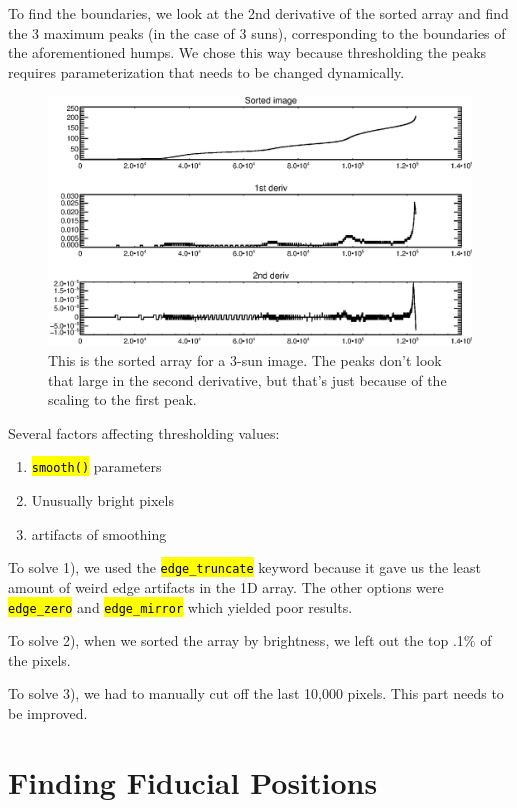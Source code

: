\documentclass[10pt]{scrartcl}
\begin{document}
To find the boundaries, we look at the 2nd derivative of the sorted array and find the 3 maximum peaks (in the case of 3 suns), corresponding to the boundaries of the aforementioned humps. We chose this way because thresholding the peaks requires parameterization that needs to be changed dynamically. 

\begin{figure}[!ht]
   \includegraphics[width=.75\textwidth]{../plots_tables_images/sortedarray.eps}%
   \caption{This is the sorted array for a 3-sun image. The peaks don't look that large in the second derivative, but that's just because of the scaling to the first peak.}\label{peaks}
\end{figure}

Several factors affecting thresholding values:

\begin{enumerate}
    \item \hl{\texttt{smooth()}} parameters
    \item Unusually bright pixels
    \item artifacts of smoothing
\end{enumerate}

To solve 1), we used the \hl{\texttt{edge\_truncate}} keyword because it gave us the least amount of weird edge artifacts in the 1D array. The other options were \hl{\texttt{edge\_zero}} and \hl{\texttt{edge\_mirror}} which yielded poor results.

To solve 2), when we sorted the array by brightness, we left out the top .1\% of the pixels.

To solve 3), we had to manually cut off the last 10,000 pixels. This part needs to be improved.


\section{Finding Fiducial Positions} %
\label{sec:finding_fiducial_positions}
\end{document}
